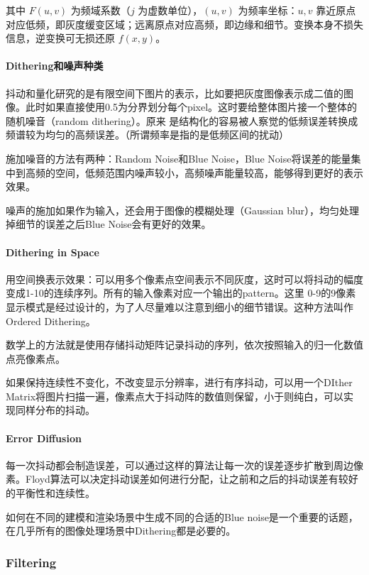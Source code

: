 其中 $F(u,v)$ 为频域系数（$j$ 为虚数单位），$(u,v)$ 为频率坐标：$u,v$ 靠近原点对应低频，即灰度缓变区域；远离原点对应高频，即边缘和细节。变换本身不损失信息，逆变换可无损还原 $f(x,y)$。

\paragraph{Dithering和噪声种类}
抖动和量化研究的是有限空间下图片的表示，比如要把灰度图像表示成二值的图像。此时如果直接使用0.5为分界划分每个pixel。这时要给整体图片接一个整体的随机噪音（random dithering）。原来
是结构化的容易被人察觉的低频误差转换成频谱较为均匀的高频误差。（所谓频率是指的是低频区间的扰动）

施加噪音的方法有两种：Random Noise和Blue Noise，Blue Noise将误差的能量集中到高频的空间，低频范围内噪声较小，高频噪声能量较高，能够得到更好的表示效果。

噪声的施加如果作为输入，还会用于图像的模糊处理（Gaussian blur），均匀处理掉细节的误差之后Blue Noise会有更好的效果。

\paragraph{Dithering in Space}

用空间换表示效果：可以用多个像素点空间表示不同灰度，这时可以将抖动的幅度变成1-10的连续序列。所有的输入像素对应一个输出的pattern。这里
0-9的9像素显示模式是经过设计的，为了人尽量难以注意到细小的细节错误。这种方法叫作Ordered Dithering。

数学上的方法就是使用存储抖动矩阵记录抖动的序列，依次按照输入的归一化数值点亮像素点。

如果保持连续性不变化，不改变显示分辨率，进行有序抖动，可以用一个DIther Matrix将图片扫描一遍，像素点大于抖动阵的数值则保留，小于则纯白，可以实现同样分布的抖动。

\paragraph{Error Diffusion}

每一次抖动都会制造误差，可以通过这样的算法让每一次的误差逐步扩散到周边像素。Floyd算法可以决定抖动误差如何进行分配，让之前和之后的抖动误差有较好的平衡性和连续性。

如何在不同的建模和渲染场景中生成不同的合适的Blue noise是一个重要的话题，在几乎所有的图像处理场景中Dithering都是必要的。

\subsubsection{Filtering}

